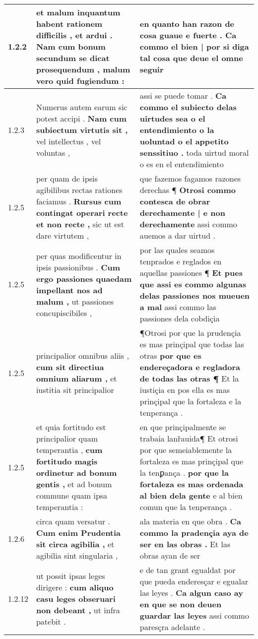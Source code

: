 \begin{tabular}{|p{1cm}|p{6.5cm}|p{6.5cm}|}
1.2.2 & et malum inquantum habent rationem difficilis , et ardui . \textbf{ Nam cum bonum secundum se dicat prosequendum , } malum vero quid fugiendum : & en quanto han razon de cosa guaue e fuerte . \textbf{ Ca commo el bien | por si diga tal cosa } que deue el omne seguir \\\hline
1.2.3 & Numerus autem earum sic potest accipi . \textbf{ Nam cum subiectum virtutis sit , } vel intellectus , vel voluntas , & assi se puede tomar . \textbf{ Ca commo el subiecto delas uirtudes sea o el entendimiento o la uoluntad o el appetito senssitiuo . } toda uirtud moral o es en el entendimiento \\\hline
1.2.5 & per quam de ipsis agibilibus rectas rationes faciamus . \textbf{ Rursus cum contingat operari recte et non recte , } sic ut est dare virtutem , & que fazemos fagamos razones derechas ¶ \textbf{ Otrosi commo contesca de obrar derechamente | e non derechamente } assi commo auemos a dar uirtud . \\\hline
1.2.5 & per quas modificentur in ipsis passionibus . \textbf{ Cum ergo passiones quaedam impellant nos ad malum , } ut passiones concupiscibiles , & por las quales seamos tenprados e reglados en aquellas passiones ¶ \textbf{ Et pues que assi es commo algunas delas passiones nos mueuen a mal } assi commo las passiones dela cobdiçia \\\hline
1.2.5 & principalior omnibus aliis , \textbf{ cum sit directiua omnium aliarum , } et iustitia sit principalior & ¶Otrosi por que la prudençia es mas prinçipal que todas las otras \textbf{ por que es endereçadora e regladora de todas las otras ¶ } Et la iustiçia en pos ella es mas prinçipal que la fortaleza e la tenperança . \\\hline
1.2.5 & et quia fortitudo est principalior quam temperantia , \textbf{ cum fortitudo magis ordinetur ad bonum gentis , } et ad bonum commune quam ipsa temperantia : & en que prinçipalmente se trabaia lanr̃auida¶ Et otrosi por que semeiablemente la fortaleza es mas prinçipal que la tenꝑança . \textbf{ por que la fortaleza es mas ordenada al bien dela gente } e al bien comun que la tenperança . \\\hline
1.2.6 & circa quam versatur . \textbf{ Cum enim Prudentia sit circa agibilia , } et agibilia sint singularia , & ala materia en que obra . \textbf{ Ca commo la pradençia aya de ser en las obras . } Et las obras ayan de ser \\\hline
1.2.12 & ut possit ipsas leges dirigere : \textbf{ cum aliquo casu leges obseruari non debeant , } ut infra patebit . & e de tan grant egualdat por que pueda enderesçar e egualar las leyes . \textbf{ Ca algun caso ay en que se non deuen guardar las leyes } assi commo paresçra adelante . \\\hline

\end{tabular}
